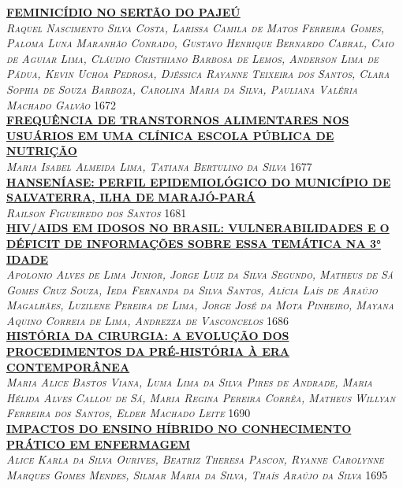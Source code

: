 \noindent \textsc{\hyperlink{trabalhos/250325.pdf.1}{\textbf{FEMINICÍDIO NO SERTÃO DO PAJEÚ}}}\\ 
\noindent \textsc{\textit{Raquel Nascimento Silva Costa, Larissa Camila de Matos Ferreira Gomes, Paloma Luna Maranhão Conrado, Gustavo Henrique Bernardo Cabral, Caio de Aguiar Lima, Cláudio Cristhiano Barbosa de Lemos, Anderson Lima de Pádua, Kevin Uchoa Pedrosa, Djéssica Rayanne Teixeira dos Santos, Clara Sophia de Souza Barboza, Carolina Maria da Silva, Pauliana Valéria Machado Galvão}} \hfill 1672\\ 

\noindent \textsc{\hyperlink{trabalhos/250228.pdf.1}{\textbf{FREQUÊNCIA DE TRANSTORNOS ALIMENTARES NOS USUÁRIOS EM UMA CLÍNICA ESCOLA PÚBLICA DE NUTRIÇÃO}}}\\ 
\noindent \textsc{\textit{Maria Isabel Almeida Lima, Tatiana Bertulino da Silva}} \hfill 1677\\ 

\noindent \textsc{\hyperlink{trabalhos/251670.pdf.1}{\textbf{HANSENÍASE: PERFIL EPIDEMIOLÓGICO DO MUNICÍPIO DE SALVATERRA, ILHA DE MARAJÓ-PARÁ}}}\\ 
\noindent \textsc{\textit{Railson Figueiredo dos Santos}} \hfill 1681\\ 

\noindent \textsc{\hyperlink{trabalhos/249708.pdf.1}{\textbf{HIV/AIDS EM IDOSOS NO BRASIL: VULNERABILIDADES E O DÉFICIT DE INFORMAÇÕES SOBRE ESSA TEMÁTICA NA 3° IDADE}}}\\ 
\noindent \textsc{\textit{Apolonio Alves de Lima Junior, Jorge Luiz da Silva Segundo, Matheus de Sá Gomes Cruz Souza, Ieda Fernanda da Silva Santos, Alícia Laís de Araújo Magalhães, Luzilene Pereira de Lima, Jorge José da Mota Pinheiro, Mayana Aquino Correia de Lima, Andrezza de Vasconcelos}} \hfill 1686\\ 

\noindent \textsc{\hyperlink{trabalhos/250632.pdf.1}{\textbf{HISTÓRIA DA CIRURGIA: A EVOLUÇÃO DOS PROCEDIMENTOS DA PRÉ-HISTÓRIA À ERA CONTEMPORÂNEA}}}\\ 
\noindent \textsc{\textit{Maria Alice Bastos Viana, Luma Lima da Silva Pires de Andrade, Maria Hélida Alves Callou de Sá, Maria Regina Pereira Corrêa, Matheus Willyan Ferreira dos Santos, Elder Machado Leite}} \hfill 1690\\ 

\noindent \textsc{\hyperlink{trabalhos/248093.pdf.1}{\textbf{IMPACTOS DO ENSINO HÍBRIDO NO CONHECIMENTO PRÁTICO EM ENFERMAGEM     }}}\\ 
\noindent \textsc{\textit{Alice Karla da Silva Ourives, Beatriz Theresa Pascon, Ryanne Carolynne Marques Gomes Mendes, Silmar Maria da Silva, Thaís Araújo da Silva}} \hfill 1695\\ 

